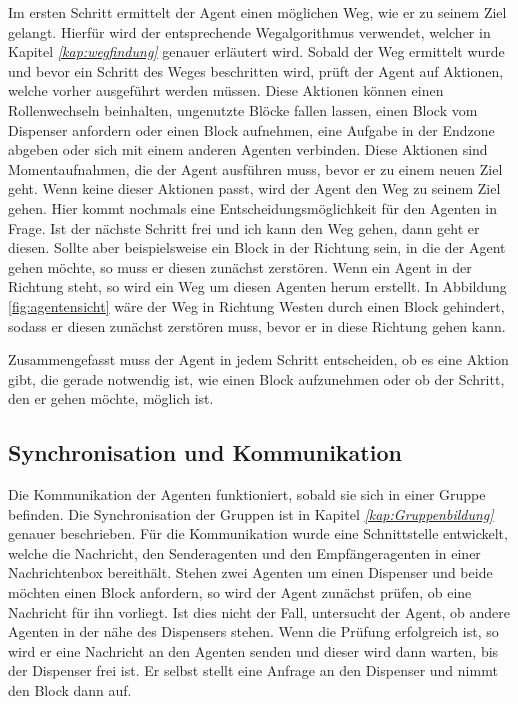 Im ersten Schritt ermittelt der Agent einen möglichen Weg, wie er zu seinem Ziel gelangt. Hierfür wird der entsprechende Wegalgorithmus verwendet, welcher in Kapitel \textit{\ref{kap:wegfindung}} genauer erläutert wird. Sobald der Weg ermittelt wurde und bevor ein Schritt des Weges beschritten wird, prüft der Agent auf Aktionen, welche vorher ausgeführt werden müssen. Diese Aktionen können einen Rollenwechseln beinhalten, ungenutzte Blöcke fallen lassen, einen Block vom Dispenser anfordern oder einen Block aufnehmen, eine Aufgabe in der Endzone abgeben oder sich mit einem anderen Agenten verbinden. Diese Aktionen sind Momentaufnahmen, die der Agent ausführen muss, bevor er zu einem neuen Ziel geht. Wenn keine dieser Aktionen passt, wird der Agent den Weg zu seinem Ziel gehen. Hier kommt nochmals eine Entscheidungsmöglichkeit für den Agenten in Frage. Ist der nächste Schritt frei und ich kann den Weg gehen, dann geht er diesen. Sollte aber beispielsweise ein Block in der Richtung sein, in die der Agent gehen möchte, so muss er diesen zunächst zerstören. Wenn ein Agent in der Richtung steht, so wird ein Weg um diesen Agenten herum erstellt. In Abbildung \ref{fig:agentensicht} wäre der Weg in Richtung Westen durch einen Block gehindert, sodass er diesen zunächst zerstören muss, bevor er in diese Richtung gehen kann. 

Zusammengefasst muss der Agent in jedem Schritt entscheiden, ob es eine Aktion gibt, die gerade notwendig ist, wie einen Block aufzunehmen oder ob der Schritt, den er gehen möchte, möglich ist.  

\subsection{Synchronisation und Kommunikation}
Die Kommunikation der Agenten funktioniert, sobald sie sich in einer Gruppe befinden. Die Synchronisation der Gruppen ist in Kapitel \textit{\ref{kap:Gruppenbildung}} genauer beschrieben. Für die Kommunikation wurde eine Schnittstelle entwickelt, welche die Nachricht, den Senderagenten und den Empfängeragenten in einer Nachrichtenbox bereithält. Stehen zwei Agenten um einen Dispenser und beide möchten einen Block anfordern, so wird der Agent zunächst prüfen, ob eine Nachricht für ihn vorliegt. Ist dies nicht der Fall, untersucht der Agent, ob andere Agenten in der nähe des Dispensers stehen. Wenn die Prüfung erfolgreich ist, so wird er eine Nachricht an den Agenten senden und dieser wird dann warten, bis der Dispenser frei ist. Er selbst stellt eine Anfrage an den Dispenser und nimmt den Block dann auf.
